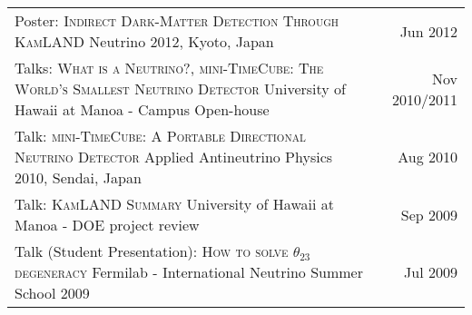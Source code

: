 \documentclass[10pt]{article} %
\begin{document}
\begin{tabularx}{\linewidth}{@{{}\textbullet\enskip}X@{\quad}r@{}}
\addlinespace[5pt]
Poster: \textsc{Indirect Dark-Matter Detection Through KamLAND} \newline Neutrino 2012, Kyoto, Japan & Jun 2012 \\

\addlinespace[5pt]
Talks: \textsc{What is a Neutrino?}, \textsc{mini-TimeCube: The World's Smallest Neutrino Detector} \newline University of Hawaii at Manoa - Campus Open-house & Nov 2010/2011 \\

\addlinespace[5pt]
Talk: \textsc{mini-TimeCube: A Portable Directional Neutrino Detector} \newline Applied Antineutrino Physics 2010, Sendai, Japan & Aug 2010 \\

\addlinespace[5pt]
Talk: \textsc{KamLAND Summary} \newline University of Hawaii at Manoa - DOE project review & Sep 2009 \\

\addlinespace[5pt]
Talk (Student Presentation): \textsc{How to solve $\theta_{23}$ degeneracy} \newline Fermilab - International Neutrino Summer School 2009 & Jul 2009 \\

\end{tabularx}
\end{document}

